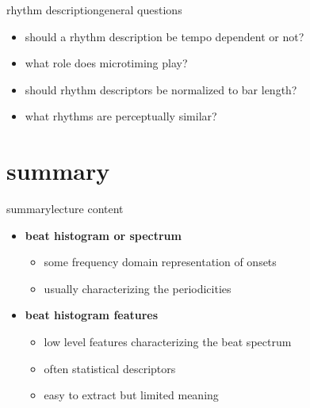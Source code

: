             \begin{frame}{rhythm description}{general questions}
                \begin{itemize}
                    \item   should a rhythm description be tempo dependent or not?
                    \smallskip
                    \item   what role does microtiming play?
                    \smallskip
                    \item   should rhythm descriptors be normalized to bar length?
                    \smallskip
                    \item   what rhythms are perceptually similar?
                \end{itemize}
            \end{frame}

    
    \section{summary}
        \begin{frame}{summary}{lecture content}
            \begin{itemize}
                \item   \textbf{beat histogram or spectrum}
                    \begin{itemize}
                        \item   some frequency domain representation of  onsets
                        \item   usually characterizing the periodicities
                    \end{itemize}
                \bigskip
                \item   \textbf{beat histogram features}
                    \begin{itemize}
                        \item   low level features characterizing the beat spectrum
                        \item   often statistical descriptors
                        \item   easy to extract but limited meaning
                    \end{itemize}
            \end{itemize}
        \end{frame}

